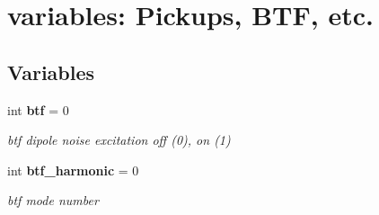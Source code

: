 \section{variables: Pickups, BTF, etc.}
\label{group__Diagnostics}
\subsection*{Variables}
\begin{CompactItemize}
\item 
int {\bf btf} = 0\label{group__Diagnostics_a0}

\begin{CompactList}\small\item\em btf dipole noise excitation off (0), on (1)\item\end{CompactList}\item 
int {\bf btf\_\-harmonic} = 0\label{group__Diagnostics_a1}

\begin{CompactList}\small\item\em btf mode number\item\end{CompactList}\end{CompactItemize}
